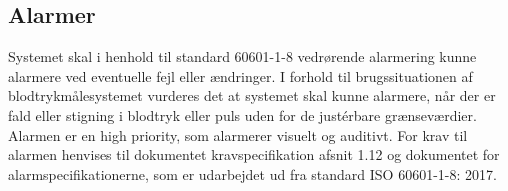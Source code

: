 \subsection{Alarmer}
Systemet skal i henhold til standard 60601-1-8 vedrørende alarmering kunne alarmere ved eventuelle fejl eller ændringer. I forhold til brugssituationen af blodtrykmålesystemet vurderes det at systemet skal kunne alarmere, når der er fald eller stigning i blodtryk eller puls uden for de justérbare grænseværdier.
Alarmen er en high priority, som alarmerer visuelt og auditivt. For krav til alarmen henvises til dokumentet kravspecifikation afsnit 1.12 og dokumentet for alarmspecifikationerne, som er udarbejdet ud fra standard ISO 60601-1-8: 2017.


\clearpage 